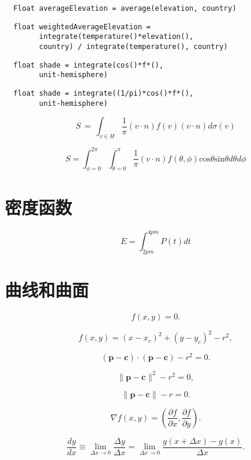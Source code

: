 \begin{lstlisting}
  Float averageElevation = average(elevation, country)
\end{lstlisting}

\begin{lstlisting}
  float weightedAverageElevation =
        integrate(temperature()*elevation(),
        country) / integrate(temperature(), country)
\end{lstlisting}

\begin{lstlisting}
  float shade = integrate(cos()*f*(),
        unit-hemisphere)
\end{lstlisting}

\begin{lstlisting}
  float shade = integrate((1/pi)*cos()*f*(),
        unit-hemisphere)
\end{lstlisting}

\[
  S\,=\,\int_{v\in H}\frac{1}{\pi}(v\cdot n)f(v)(v\cdot n)d\sigma(v)
\]

\[
  S=\int_{\phi=0}^{2\pi}\int_{\theta=0}^{\pi}\frac{1}{\pi}(v\cdot n)f(\theta,\phi)\mathrm{cos}\theta\mathrm{sin}\theta d\theta d\phi
\]

\section{密度函数}

\[
  E=\int_{2p m}^{4p m}P(t) dt
\]

\section{曲线和曲面}

\[
  f(x,y)=0.
\]

\begin{equation}
  f(x,y)=(x-x_{c})^{2}+(y-y_{c})^{2}-r^{2},
\end{equation}

\[
  (\mathbf{p}-\mathbf{c})\cdot(\mathbf{p}-\mathbf{c})-r^{2}=0.
\]

\[
  \|\mathbf{p}-\mathbf{c}\|^{2}-r^{2}=0,
\]

\[
  \|\mathbf{p}-\mathbf{c}\|-r=0.
\]

\[
  \nabla f(x,y)=\left({\frac{\partial f}{\partial x}},{\frac{\partial f}{\partial y}}\right).
\]

\begin{equation}
  {\frac{d y}{d x}}\equiv\operatorname*{lim}_{\Delta x\to0}{\frac{\Delta y}{\Delta x}}=\operatorname*{lim}_{\Delta x\to0}{\frac{g(x+\Delta x)-g(x)}{\Delta x}}.
\end{equation}

